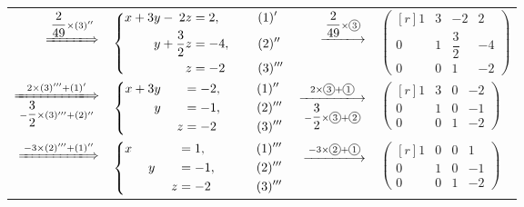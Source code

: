 \begin{table}[htbp]
\begin{tabular}{|*{2}{@{}r@{}l|}}
    $\xLongrightarrow{\dfrac{2}{49} \times (3)''}$
    & $\left\{
        \begin{alignedat}{4}
            x  & +{} & 3y & -{} &  2z & = 2,  & \hspace{2.3em} & (1)'\\
                &     &  y & +{} & \dfrac{3}{2}z & = -4, & & (2)''\\
                &     &    &     &   z & = -2  & & (3)'''
        \end{alignedat}
    \right. $
    & $\xlongrightarrow{\dfrac{2}{49} \times \tc{3}}$
    & $\begin{pmatrix*}[r]
        1 &  3 & -2 & 2 \\
        0 &  1 & \dfrac{3}{2} & -4 \\[1em]
        0 &  0 & 1 & -2
    \end{pmatrix*}$ \\


    $\xLongrightarrow[-\dfrac{3}{2} \times (3)''' + (2)'']{2 \times (3)''' + (1)'}$
    & $\left\{
        \begin{alignedat}{4}
            x   & +{} & 3y & \phantom{+{}} & \phantom{1z} & = -2,  & \hspace{2.9em} & (1)''\\
                &     &  y &     &    & = -1, & & (2)'''\\
                &     &    &     &  z & = -2  & & (3)'''
        \end{alignedat}
    \right.$
    & $\xlongrightarrow[-\dfrac{3}{2} \times \tc{3} + \tc{2}]{2 \times \tc{3} + \tc{1}}$
    & $\begin{pmatrix*}[r]
        1 &  3 & 0 & -2 \\
        0 &  1 & 0 & -1 \\
        0 &  0 & 1 & -2
    \end{pmatrix*}$ \\


    $\xLongrightarrow{-3 \times (2)''' + (1)''}$
    & $\left\{
        \begin{alignedat}{4}
            x   & \phantom{ +{} } & \phantom{ 3y } & \phantom{ +{} } & \phantom{ 1z } & = 1,  & \hspace{3.3em} & (1)'''\\
                &     &  y &     &    & = -1, & & (2)'''\\
                &     &    &     &  z & = -2  & & (3)'''
        \end{alignedat}
    \right.$
    & $\xlongrightarrow{-3 \times \tc{2} + \tc{1}}$
    & $\begin{pmatrix*}[r]
        1 &  0 & 0 &  1 \\
        0 &  1 & 0 & -1 \\
        0 &  0 & 1 & -2
    \end{pmatrix*}$
    \\ \hline
\end{tabular}
\end{table}


